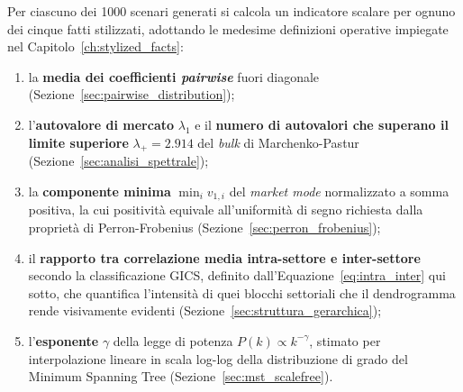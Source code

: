 Per ciascuno dei 1000 scenari generati si calcola un indicatore scalare per ognuno dei cinque fatti stilizzati, adottando le medesime definizioni operative impiegate nel Capitolo~\ref{ch:stylized_facts}:
\begin{enumerate}
    \item la \textbf{media dei coefficienti \emph{pairwise}} fuori diagonale (Sezione~\ref{sec:pairwise_distribution});
    \item l'\textbf{autovalore di mercato} $\lambda_1$ e il \textbf{numero di autovalori che superano il limite superiore} $\lambda_+ = 2.914$ del \emph{bulk} di Marchenko-Pastur (Sezione~\ref{sec:analisi_spettrale});
    \item la \textbf{componente minima} $\min_i v_{1,i}$ del \emph{market mode} normalizzato a somma positiva, la cui positività equivale all'uniformità di segno richiesta dalla proprietà di Perron-Frobenius (Sezione~\ref{sec:perron_frobenius});
    \item il \textbf{rapporto tra correlazione media intra-settore e inter-settore} secondo la classificazione GICS, definito dall'Equazione~\ref{eq:intra_inter} qui sotto, che quantifica l'intensità di quei blocchi settoriali che il dendrogramma rende visivamente evidenti (Sezione~\ref{sec:struttura_gerarchica});
    \item l'\textbf{esponente} $\gamma$ della legge di potenza $P(k) \propto k^{-\gamma}$, stimato per interpolazione lineare in scala log-log della distribuzione di grado del Minimum Spanning Tree (Sezione~\ref{sec:mst_scalefree}).
\end{enumerate}

